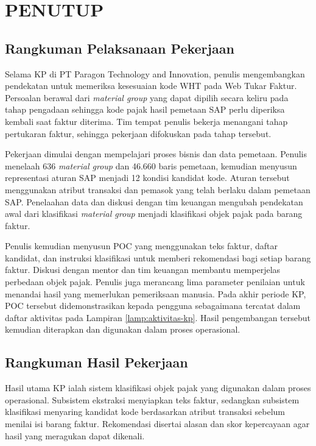 \cleardoublepage
\chapter{PENUTUP}
\label{chap:penutup}
\section{Rangkuman Pelaksanaan Pekerjaan}
Selama KP di PT Paragon Technology and Innovation, penulis mengembangkan pendekatan untuk memeriksa kesesuaian kode WHT pada Web Tukar Faktur. Persoalan berawal dari \textit{material group} yang dapat dipilih secara keliru pada tahap pengadaan sehingga kode pajak hasil pemetaan SAP perlu diperiksa kembali saat faktur diterima. Tim tempat penulis bekerja menangani tahap pertukaran faktur, sehingga pekerjaan difokuskan pada tahap tersebut.

Pekerjaan dimulai dengan mempelajari proses bisnis dan data pemetaan. Penulis menelaah 636 \textit{material group} dan 46.660 baris pemetaan, kemudian menyusun representasi aturan SAP menjadi 12 kondisi kandidat kode. Aturan tersebut menggunakan atribut transaksi dan pemasok yang telah berlaku dalam pemetaan SAP. Penelaahan data dan diskusi dengan tim keuangan mengubah pendekatan awal dari klasifikasi \textit{material group} menjadi klasifikasi objek pajak pada barang faktur.

Penulis kemudian menyusun POC yang menggunakan teks faktur, daftar kandidat, dan instruksi klasifikasi untuk memberi rekomendasi bagi setiap barang faktur. Diskusi dengan mentor dan tim keuangan membantu memperjelas perbedaan objek pajak. Penulis juga merancang lima parameter penilaian untuk menandai hasil yang memerlukan pemeriksaan manusia. Pada akhir periode KP, POC tersebut didemonstrasikan kepada pengguna sebagaimana tercatat dalam daftar aktivitas pada Lampiran \ref{lamp:aktivitas-kp}. Hasil pengembangan tersebut kemudian diterapkan dan digunakan dalam proses operasional.

\section{Rangkuman Hasil Pekerjaan}
Hasil utama KP ialah sistem klasifikasi objek pajak yang digunakan dalam proses operasional. Subsistem ekstraksi menyiapkan teks faktur, sedangkan subsistem klasifikasi menyaring kandidat kode berdasarkan atribut transaksi sebelum menilai isi barang faktur. Rekomendasi disertai alasan dan skor kepercayaan agar hasil yang meragukan dapat dikenali.

